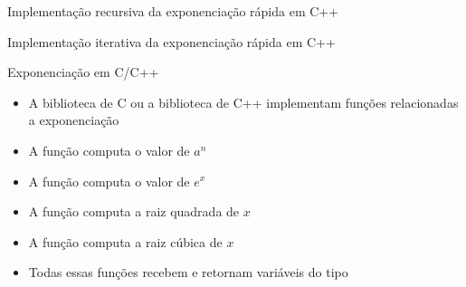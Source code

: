 \begin{frame}[fragile]{Implementação recursiva da exponenciação rápida em C++}
\end{frame}

\begin{frame}[fragile]{Implementação iterativa da exponenciação rápida em C++}
\end{frame}

\begin{frame}[fragile]{Exponenciação em C/C++}

    \begin{itemize}
        \item A biblioteca  de C ou a biblioteca  de C++ implementam funções relacionadas a exponenciação

        \item A função  computa o valor de $a^n$

        \item A função  computa o valor de $e^x$

        \item A função  computa a raiz quadrada de $x$

        \item A função  computa a raiz cúbica de $x$

        \item Todas essas funções recebem e retornam variáveis do tipo 
    \end{itemize}

\end{frame}
